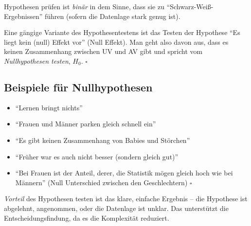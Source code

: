 \documentclass[
  ngerman,
  letterpaper,
  twoside,
  open=any]{scrbook}
\providecommand{\tightlist}{%
  \setlength{\itemsep}{0pt}\setlength{\parskip}{0pt}}\usepackage{longtable,booktabs,array}
\theoremstyle{definition}
\theoremstyle{plain}
\theoremstyle{definition}
\theoremstyle{definition}
\theoremstyle{definition}
\theoremstyle{definition}
\theoremstyle{remark}
\begin{document}
Hypothesen prüfen ist \emph{binär} in dem Sinne, dass sie zu
\enquote{Schwarz-Weiß-Ergebnissen} führen (sofern die Datenlage stark
genug ist).

\begin{tcolorbox}[enhanced jigsaw, arc=.35mm, bottomrule=.15mm, bottomtitle=1mm, breakable, colback=white, colbacktitle=quarto-callout-important-color!10!white, colframe=quarto-callout-important-color-frame, coltitle=black, left=2mm, leftrule=.75mm, opacityback=0, opacitybacktitle=0.6, rightrule=.15mm, title=\textcolor{quarto-callout-important-color}{\faExclamation}\hspace{0.5em}{Wichtig}, titlerule=0mm, toprule=.15mm, toptitle=1mm]

Eine gängige Variante des Hypothesentestens\footnotemark{} ist das
Testen der Hypothese \enquote{Es liegt kein (null) Effekt vor} (Null
Effekt). Man geht also davon aus, dass es keinen Zusammenhang zwischen
UV und AV gibt und spricht vom \emph{Nullhypothesen testen}, \(H_0\).
\(\square\)

\end{tcolorbox}


\subsection{Beispiele für
Nullhypothesen}\label{beispiele-fuxfcr-nullhypothesen-1}

\begin{itemize}
\tightlist
\item
  \enquote{Lernen bringt nichts}
\item
  \enquote{Frauen und Männer parken gleich schnell ein}
\item
  \enquote{Es gibt keinen Zusammenhang von Babies und Störchen}
\item
  \enquote{Früher war es auch nicht besser (sondern gleich gut)}
\item
  \enquote{Bei Frauen ist der Anteil, derer, die Statistik mögen gleich
  hoch wie bei Männern} (Null Unterschied zwischen den Geschlechtern)
  \(\square\)
\end{itemize}

\emph{Vorteil} des Hypothesen testen ist das klare, einfache Ergebnis --
die Hypothese ist abgelehnt, angenommen, oder die Datenlage ist unklar.
Das unterstützt die Entscheidungsfindung, da es die Komplexität
reduziert.
\end{document}
